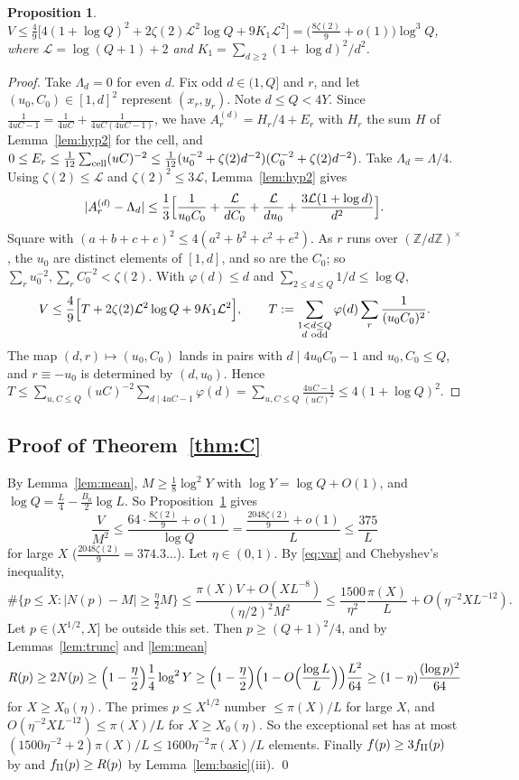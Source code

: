 \documentclass[11pt,reqno]{amsart}
\newtheorem{proposition}[theorem]{Proposition}
\theoremstyle{definition}
\newcommand{\Z}{\mathbb Z}
\begin{document}
\begin{proposition}\label{prop:V}
$V\le\frac49\bigl[4(1+\log Q)^2+2\zeta(2)\mathcal L^2\log Q+9K_1\mathcal L^2\bigr]
=\bigl(\tfrac{8\zeta(2)}9+o(1)\bigr)\log^3Q$, where $\mathcal L=\log(Q+1)+2$
and $K_1=\sum_{d\ge2}(1+\log d)^2/d^2$.
\end{proposition}
\begin{proof}
Take $\Lambda_d=0$ for even $d$.  Fix odd $d\in(1,Q]$ and $r$, and let
$(u_0,C_0)\in[1,d]^2$ represent $(x_r,y_r)$.  Note $d\le Q<4Y$.  Since
$\frac1{4uC-1}=\frac1{4uC}+\frac1{4uC(4uC-1)}$, we have
$A^{(d)}_r=H_r/4+E_r$ with $H_r$ the sum $H$ of Lemma~\ref{lem:hyp2} for
the cell, and
$0\le E_r\le\frac1{12}\sum_{\rm cell}(uC)^{-2}\le\frac1{12}(u_0^{-2}+\zeta(2)d^{-2})(C_0^{-2}+\zeta(2)d^{-2})$.
Take $\Lambda_d=\Lambda/4$.  Using $\zeta(2)\le\mathcal L$ and
$\zeta(2)^2\le3\mathcal L$, Lemma~\ref{lem:hyp2} gives
\[
 |A_r^{(d)}-\Lambda_d|\le\frac13\Bigl[\frac1{u_0C_0}+\frac{\mathcal L}{dC_0}+\frac{\mathcal
 L}{du_0}+\frac{3\mathcal L(1+\log d)}{d^2}\Bigr].
\]
Square with $(a+b+c+e)^2\le4(a^2+b^2+c^2+e^2)$.  As $r$ runs over
$(\Z/d\Z)^\times$, the $u_0$ are distinct elements of $[1,d]$, and so are
the $C_0$; so $\sum_ru_0^{-2},\sum_rC_0^{-2}<\zeta(2)$.  With $\varphi(d)\le
d$ and $\sum_{2\le d\le Q}1/d\le\log Q$,
\[
 V\le\frac49\Bigl[T+2\zeta(2)\mathcal L^2\log Q+9K_1\mathcal L^2\Bigr],\qquad
 T:=\sum_{\substack{1<d\le Q\\ d\ \mathrm{odd}}}\varphi(d)\sum_r\frac1{(u_0C_0)^2}.
\]
The map $(d,r)\mapsto(u_0,C_0)$ lands in pairs with $d\mid4u_0C_0-1$ and
$u_0,C_0\le Q$, and $r\equiv-u_0$ is determined by $(d,u_0)$.  Hence
$T\le\sum_{u,C\le Q}(uC)^{-2}\sum_{d\mid4uC-1}\varphi(d)=\sum_{u,C\le
Q}\frac{4uC-1}{(uC)^2}\le4(1+\log Q)^2$.
\end{proof}

\subsection{Proof of Theorem~\ref{thm:C}}
By Lemma~\ref{lem:mean}, $M\ge\frac18\log^2Y$ with $\log Y=\log
Q+O(1)$, and $\log Q=\frac L4-\frac{B_0}2\log L$.  So
Proposition~\ref{prop:V} gives
\[
 \frac V{M^2}\le\frac{64\cdot\frac{8\zeta(2)}9+o(1)}{\log Q}
 =\frac{\frac{2048\zeta(2)}9+o(1)}{L}\le\frac{375}{L}
\]
for large $X$ ($\frac{2048\zeta(2)}9=374.3\ldots$).  Let $\eta\in(0,1)$.  By
\eqref{eq:var} and Chebyshev's inequality,
\[
 \#\{p\le X:|N(p)-M|\ge\tfrac\eta2M\}\le\frac{\pi(X)V+O(XL^{-8})}{(\eta/2)^2M^2}
 \le\frac{1500}{\eta^2}\frac{\pi(X)}{L}+O(\eta^{-2}XL^{-12}).
\]
Let $p\in(X^{1/2},X]$ be outside this set.  Then $p\ge(Q+1)^2/4$, and by
Lemmas~\ref{lem:trunc} and \ref{lem:mean}
\[
 R(p)\ge2N(p)\ge\Bigl(1-\frac\eta2\Bigr)\frac14\log^2Y\ge
 \Bigl(1-\frac\eta2\Bigr)\Bigl(1-O\Bigl(\frac{\log L}{L}\Bigr)\Bigr)\frac{L^2}{64}
 \ge(1-\eta)\frac{(\log p)^2}{64}
\]
for $X\ge X_0(\eta)$.  The primes $p\le X^{1/2}$ number $\le\pi(X)/L$ for
large $X$, and $O(\eta^{-2}XL^{-12})\le\pi(X)/L$ for $X\ge X_0(\eta)$.  So
the exceptional set has at most $(1500\eta^{-2}+2)\pi(X)/L\le
1600\eta^{-2}\pi(X)/L$ elements.  Finally $f(p)\ge3f_{\rm II}(p)$ by
\cite[(1.4)]{ET} and $f_{\rm II}(p)\ge R(p)$ by Lemma~\ref{lem:basic}(iii).
\qed
\end{document}
